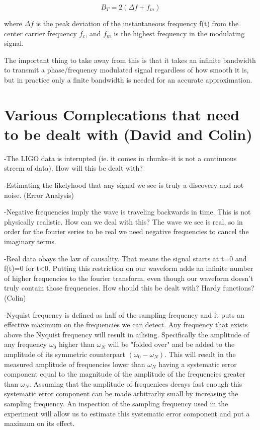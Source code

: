 \documentclass[twocolumn, groupedaddress]{revtex4-1}
\begin{document}
\begin{equation}
B_T = 2( \Delta f + f_m )
\end{equation}

where $\Delta f$ is the peak deviation of the instantaneous frequency f(t) from the center carrier frequency $f_c$, and $f_m$ is the highest frequency in the modulating signal.


The important thing to take away from this is that it takes an infinite bandwidth to transmit a phase/frequency modulated signal regardless of how smooth it is, but in practice only a finite bandwidth is needed for an accurate approximation.

\section{Various Complecations that need to be dealt with (David and Colin)}
-The LIGO data is interupted (ie. it comes in chunks--it is not a continuous streem of data).  How will this be dealt with?

-Estimating the likelyhood that any signal we see is truly a discovery and not noise. (Error Analysis)

-Negative frequencies imply the wave is traveling backwards in time.  This is not physically realistic.  How can we deal with this?  The wave we see is real, so in order for the fourier series to be real we need negative frequencies to cancel the imaginary terms.

-Real data obays the law of causality.  That means the signal starts at t=0 and f(t)=0 for t<0.  Putting this restriction on our waveform adds an infinite number of higher frequencies to the fourier transform, even though our waveform doesn't truly contain those frequencies.  How should this be dealt with?  Hardy functions?  (Colin)

-Nyquist frequency is defined as half of the sampling frequency and it puts an effective maximum on the frequencies we can detect. Any frequency that exists above the Nyquist frequency will result in ailising. Specifically the amplitude of any frequency $\omega_0$ higher than $\omega_N$ will be "folded over" and be added to the amplitude of its symmetric counterpart $(\omega_0 - \omega_N)$. This will result in the measured amplitude of frequencies lower than $\omega_N$ having a systematic error component equal to the magnitude of the amplitude of the frequencies greater than $\omega_N$.  Assuming that the amplitude of frequenices decays fast enough this systematic error component can be made arbitrarliy small by increasing the sampling frequency. An inspection of the sampling frequency used in the experiment will allow us to estimate this systematic error component and put a maximum on its effect. 
\end{document}
